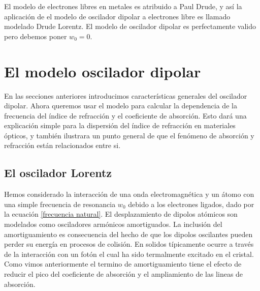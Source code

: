 \documentclass[a4paper,openright,12pt]{book}
\begin{document}
El modelo de electrones libres en metales es atribuido a Paul Drude, y así la aplicación de el modelo de oscilador dipolar  a electrones libre es llamado modelado Drude Lorentz. El modelo de oscilador dipolar es perfectamente valido pero debemos poner $w_{0}=0$.

\section{El modelo oscilador dipolar}
En las secciones anteriores introducimos características generales del oscilador dipolar. Ahora queremos usar el modelo para calcular la dependencia de la frecuencia del índice de refracción y el coeficiente de absorción. Esto dará una explicación simple para la dispersión del índice de refracción en materiales ópticos, y también ilustrara un punto general de que el fenómeno de absorción y refracción están relacionados entre si.
\subsection{El oscilador Lorentz}
Hemos considerado la interacción de una onda electromagnética y un átomo con una simple frecuencia de resonancia $w_{0}$ debido a los electrones ligados, dado por la ecuación \ref{frecuencia natural}. El desplazamiento de dipolos atómicos son modelados como osciladores armónicos amortiguados. La inclusión del amortiguamiento es consecuencia del hecho de que los dipolos oscilantes pueden perder su energía en procesos de colisión. En solidos típicamente ocurre a través de la interacción con un fotón el cual ha sido termalmente excitado en el cristal. Como vimos anteriormente el termino de amortiguamiento tiene el efecto de reducir el pico del coeficiente de absorción y el ampliamiento de las lineas de absorción.
\end{document}
